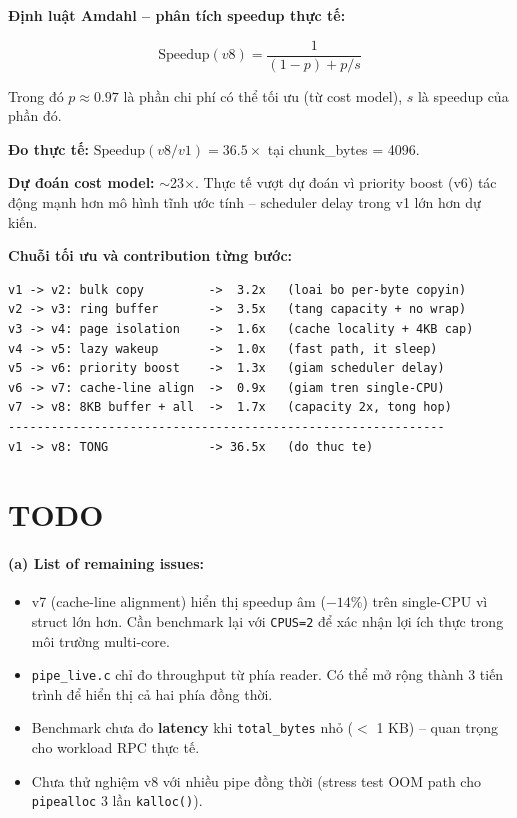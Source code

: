 \documentclass[11pt,a4paper]{article}
\begin{document}
\begin{callout}
\textbf{Định luật Amdahl -- phân tích speedup thực tế:}

\[
\text{Speedup}(v8) = \frac{1}{(1-p) + p/s}
\]

Trong đó $p \approx 0.97$ là phần chi phí có thể tối ưu (từ cost model), $s$ là speedup của phần đó.

\textbf{Đo thực tế:} $\text{Speedup}(v8/v1) = \mathbf{36.5\times}$ tại chunk\_bytes = 4096.

\textbf{Dự đoán cost model:} $\sim$23$\times$. Thực tế vượt dự đoán vì priority boost (v6) tác động mạnh hơn mô hình tĩnh ước tính -- scheduler delay trong v1 lớn hơn dự kiến.
\end{callout}

\textbf{Chuỗi tối ưu và contribution từng bước:}

\begin{lstlisting}[style=plain]
v1 -> v2: bulk copy         ->  3.2x   (loai bo per-byte copyin)
v2 -> v3: ring buffer       ->  3.5x   (tang capacity + no wrap)
v3 -> v4: page isolation    ->  1.6x   (cache locality + 4KB cap)
v4 -> v5: lazy wakeup       ->  1.0x   (fast path, it sleep)
v5 -> v6: priority boost    ->  1.3x   (giam scheduler delay)
v6 -> v7: cache-line align  ->  0.9x   (giam tren single-CPU)
v7 -> v8: 8KB buffer + all  ->  1.7x   (capacity 2x, tong hop)
-------------------------------------------------------------
v1 -> v8: TONG              -> 36.5x   (do thuc te)
\end{lstlisting}

\section{TODO}

\paragraph{(a) List of remaining issues:}
\begin{itemize}
  \item v7 (cache-line alignment) hiển thị speedup âm ($-14\%$) trên single-CPU vì struct lớn hơn. Cần benchmark lại với \texttt{CPUS=2} để xác nhận lợi ích thực trong môi trường multi-core.
  \item \texttt{pipe\_live.c} chỉ đo throughput từ phía reader. Có thể mở rộng thành 3 tiến trình để hiển thị cả hai phía đồng thời.
  \item Benchmark chưa đo \textbf{latency} khi \texttt{total\_bytes} nhỏ ($<$ 1 KB) -- quan trọng cho workload RPC thực tế.
  \item Chưa thử nghiệm v8 với nhiều pipe đồng thời (stress test OOM path cho \texttt{pipealloc} 3 lần \texttt{kalloc()}).
\end{itemize}
\end{document}
